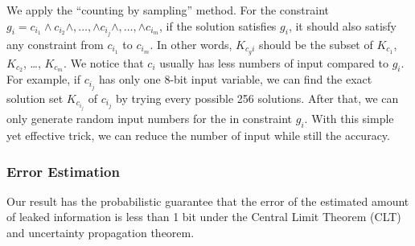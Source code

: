 We apply the ``counting by sampling'' method. For
the constraint $g_{i}= c_{i_1} \land c_{i_2} \land ,\ldots, \land c_{i_j} \land
,\ldots, \land c_{i_m}$, if the solution satisfies $g_{i}$, it should also
satisfy any constraint from $c_{i_1}$ to $c_{i_m}$. In other words, $K_{c_gi}$
should be the subset of $K_{c_1}$, $K_{c_2}$, \ldots , $K_{c_m}$. We notice that
$c_i$ usually has less numbers of input compared to $g_{i}$. For example, if
$c_{i_j}$ has only one 8-bit input variable, we can find the exact solution set
$K_{c_{i_j}}$ of $c_{i_j}$ by trying every possible 256 solutions. After that,
we can only generate random input numbers for the  in
constraint $g_{i}$. With this simple yet effective trick, we can reduce the number of input
while still  the accuracy.




\subsubsection{Error Estimation}
\label{sssec:errest}
Our result has the probabilistic guarantee that the error of the estimated amount of leaked 
information is less than 1 bit under the Central Limit Theorem (CLT) and uncertainty
propagation theorem.


